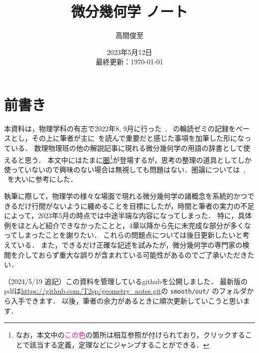 \documentclass{ltjsreport}
\theoremstyle{mystyle} %
\numberwithin{equation}{section}
\begin{document}
\title{微分幾何学 ノート}
\author{高間俊至}
\date{2023年5月12日 \\ 最終更新：\today}
\maketitle

\section*{前書き}

本資料は，物理学科の有志で2022年8, 9月に行った~\cite{Morita}, ~\cite{EGH}の輪読ゼミの記録をベースとし，その上に筆者が主に~\cite{Lee12}を読んで重要だと感じた事項を加筆した形になっている．
数理物理班の他の解説記事に現れる微分幾何学の用語の辞書として使えると思う．
本文中にはたまに\hyperref[def:category]{圏}\footnote{なお，本文中の\textcolor{DeepPink}{この色}の箇所は相互参照が付けられており，クリックすることで該当する定義，定理などにジャンプすることができる．}が登場するが，思考の整理の道具としてしか使っていないので興味のない場合は無視しても問題はない．圏論については~\cite{Awodey}, ~\cite{Brendan}を大いに参考にした．

執筆に際して，物理学の様々な場面で現れる微分幾何学の諸概念を系統的かつできるだけ行間がないように纏めることを目標にしたが，時間と筆者の実力の不足によって，2023年5月の時点では中途半端な内容になってしまった．
特に，具体例をほとんど紹介できなかったことと，4章以降から先に未完成な部分が多くなってしまったことを謝りたい．
これらの問題点については後日更新したいと考えている．
また，できるだけ正確な記述を試みたが，微分幾何学の専門家の検閲を介しておらず重大な誤りが含まれている可能性があるのでご了承いただきたい．

（2024/5/19 追記）この資料を管理しているgithubを公開しました．
最新版のpdfは\url{https://github.com/T2sp/geometry_notes.git}の \texttt{smooth/out/} のフォルダから入手できます．
以後，筆者の余力があるときに順次更新していこうと思います．
\setcounter{tocdepth}{2}
\tableofcontents
\end{document}
